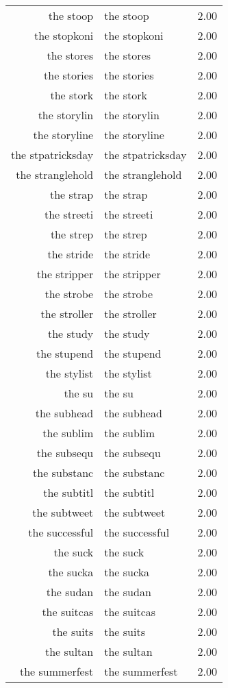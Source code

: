 \begin{table}[ht]
\begin{tabular}{rlr}
  the stoop & the stoop & 2.00 \\ 
  the stopkoni & the stopkoni & 2.00 \\ 
  the stores & the stores & 2.00 \\ 
  the stories & the stories & 2.00 \\ 
  the stork & the stork & 2.00 \\ 
  the storylin & the storylin & 2.00 \\ 
  the storyline & the storyline & 2.00 \\ 
  the stpatricksday & the stpatricksday & 2.00 \\ 
  the stranglehold & the stranglehold & 2.00 \\ 
  the strap & the strap & 2.00 \\ 
  the streeti & the streeti & 2.00 \\ 
  the strep & the strep & 2.00 \\ 
  the stride & the stride & 2.00 \\ 
  the stripper & the stripper & 2.00 \\ 
  the strobe & the strobe & 2.00 \\ 
  the stroller & the stroller & 2.00 \\ 
  the study & the study & 2.00 \\ 
  the stupend & the stupend & 2.00 \\ 
  the stylist & the stylist & 2.00 \\ 
  the su & the su & 2.00 \\ 
  the subhead & the subhead & 2.00 \\ 
  the sublim & the sublim & 2.00 \\ 
  the subsequ & the subsequ & 2.00 \\ 
  the substanc & the substanc & 2.00 \\ 
  the subtitl & the subtitl & 2.00 \\ 
  the subtweet & the subtweet & 2.00 \\ 
  the successful & the successful & 2.00 \\ 
  the suck & the suck & 2.00 \\ 
  the sucka & the sucka & 2.00 \\ 
  the sudan & the sudan & 2.00 \\ 
  the suitcas & the suitcas & 2.00 \\ 
  the suits & the suits & 2.00 \\ 
  the sultan & the sultan & 2.00 \\ 
  the summerfest & the summerfest & 2.00 \\ 

\end{tabular}
\end{table}
